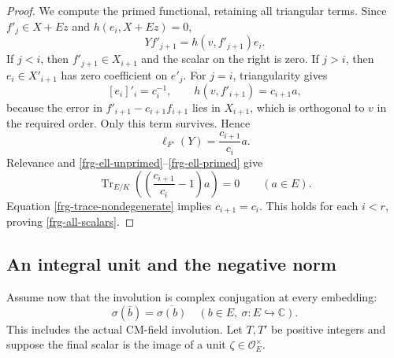 \begin{proof}
We compute the primed functional, retaining all triangular
terms. Since $f'_j\in X+Ez$ and $h(e_i,X+Ez)=0$,
\[
                            Yf'_{j+1}=h(v,f'_{j+1})e_i.
\]
If $j<i$, then $f'_{j+1}\in X_{i+1}$ and the scalar on
the right is zero. If $j>i$, then $e_i\in X'_{i+1}$
has zero coefficient on $e'_j$. For $j=i$, triangularity
gives
\[
 [e_i]'_i=c_i^{-1},\qquad
 h(v,f'_{i+1})=c_{i+1}a,
\]
because the error in $f'_{i+1}-c_{i+1}f_{i+1}$ lies in
$X_{i+1}$, which is orthogonal to $v$ in the required order.
Only this term survives. Hence
\begin{equation}\label{frg-ell-primed}
                         \ell_{F'}(Y)=\frac{c_{i+1}}{c_i}a.
\end{equation}
Relevance and \eqref{frg-ell-unprimed}--\eqref{frg-ell-primed}
give
\[
 \operatorname{Tr}_{E/K}\left(\left(\frac{c_{i+1}}{c_i}-1\right)a\right)=0
                                      \qquad(a\in E).
\]
Equation \eqref{frg-trace-nondegenerate} implies
$c_{i+1}=c_i$. This holds for each $i<r$, proving
\eqref{frg-all-scalars}.
\end{proof}

\subsection{An integral unit and the negative norm}

Assume now that the involution is complex conjugation at every
embedding:
\begin{equation}\label{frg-all-embeddings}
                 \sigma(\bar b)=\overline{\sigma(b)}
                    \quad(b\in E,\ \sigma:E\hookrightarrow\mathbb C).
\end{equation}
This includes the actual CM-field involution. Let $T,T'$ be
positive integers and suppose the final scalar is the image
of a unit $\zeta\in\mathcal O_E^\times$.

